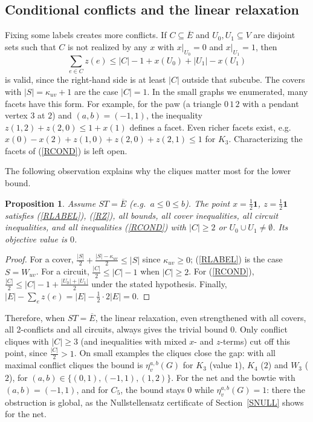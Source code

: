 \documentclass[a4paper,11pt]{article}
\newcommand{\eg}{{e.g.~}}
\newcommand{\Eb}{\overline{E}}
\newcommand{\etav}{\eta_v^{a,b}}
\newtheorem{prop}{Proposition}
\theoremstyle{definition}
\begin{document}
\subsection{Conditional conflicts and the linear relaxation}

Fixing some labels creates more conflicts. If $C \subseteq \Eb$ and $U_0, U_1 \subseteq V$ are disjoint sets such that $C$ is not realized by any
$x$ with $x|_{U_0} = 0$ and $x|_{U_1} = 1$, then
\begin{equation} \label{RCOND}
\sum_{e \in C} z(e) \leq |C| - 1 + x(U_0) + |U_1| - x(U_1)
\end{equation}
is valid, since the right-hand side is at least $|C|$ outside that subcube. The covers with $|S| = \kappa_{uv} + 1$ are the case $|C| = 1$. In
the small graphs we enumerated, many facets have this form. For example, for the paw (a triangle $0\,1\,2$ with a pendant vertex $3$ at $2$) and
$(a,b) = (-1,1)$, the inequality $z(1,2) + z(2,0) \leq 1 + x(1)$ defines a facet. Even richer facets exist, \eg
$x(0) - x(2) + z(1,0) + z(2,0) + z(2,1) \leq 1$ for $K_3$. Characterizing the facets of (\ref{RCOND}) is left open.

The following observation explains why the cliques matter most for the lower bound.

\begin{prop} \label{PHALF}
Assume $ST = \Eb$ (\eg $a \leq 0 \leq b$). The point $x = \frac12 \mathbf{1}$, $z = \frac12 \mathbf{1}$ satisfies (\ref{RLABEL}), (\ref{RZ}), all
bounds, all cover inequalities, all circuit inequalities, and all inequalities (\ref{RCOND}) with $|C| \geq 2$ or $U_0 \cup U_1 \neq \emptyset$. Its
objective value is $0$.
\end{prop}
\begin{proof}
For a cover, $\frac{|S|}{2} + \frac{|S| - \kappa_{uv}}{2} \leq |S|$ since $\kappa_{uv} \geq 0$; (\ref{RLABEL}) is the case $S = W_{uv}$. For a circuit,
$\frac{|C|}{2} \leq |C| - 1$ when $|C| \geq 2$. For (\ref{RCOND}), $\frac{|C|}{2} \leq |C| - 1 + \frac{|U_0| + |U_1|}{2}$ under the stated hypothesis.
Finally, $|E| - \sum_{e} z(e) = |E| - \frac12 \cdot 2|E| = 0$.
\end{proof}

Therefore, when $ST = \Eb$, the linear relaxation, even strengthened with all covers, all 2-conflicts and all circuits, always gives the trivial bound $0$. Only conflict
cliques with $|C| \geq 3$ (and inequalities with mixed $x$- and $z$-terms) cut off this point, since $\frac{|C|}{2} > 1$. On small examples the cliques
close the gap: with all maximal conflict cliques the bound is $\eta_v^{a,b}(G)$ for $K_3$ (value $1$), $K_4$ ($2$) and $W_3$ ($2$), for
$(a,b) \in \{(0,1),(-1,1),(1,2)\}$. For the net and the bowtie with $(a,b) = (-1,1)$, and for $C_5$, the bound stays $0$ while
$\etav(G) = 1$: there the obstruction is global, as the Nullstellensatz certificate of Section~\ref{SNULL} shows for the net.
\end{document}
